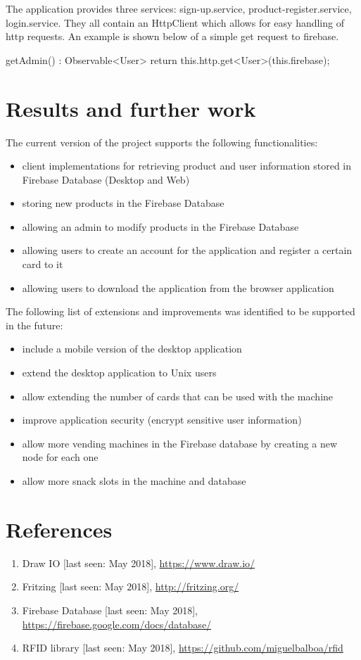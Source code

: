 \documentclass[a4paper,11pt]{article}
\begin{document}
The application provides three services: sign-up.service, product-register.service, login.service. They all contain an HttpClient
which allows for easy handling of http requests. An example is shown below of a simple get request to firebase.
\begin{python}
getAdmin() : Observable<User>{
    return this.http.get<User>(this.firebase);
  }
\end{python}
\section{Results and further work}

The current version of the project supports the following functionalities:
\begin{itemize}
\item client implementations for retrieving product and user information stored in Firebase Database (Desktop and Web)
\item storing new products in the Firebase Database
\item allowing an admin to modify products in the Firebase Database
\item allowing users to create an account for the application and register a certain card to it
\item allowing users to download the application from the browser application\\
\end{itemize}

The following list of extensions and improvements was identified to be supported in the future:
\begin{itemize}
\item include a mobile version of the desktop application
\item extend the desktop application to Unix users
\item allow extending the number of cards that can be used with the machine 
\item improve application security (encrypt sensitive user information)
\item allow more vending machines in the Firebase database by creating a new node for each one
\item allow more snack slots in the machine and database
\end{itemize}

\newpage
\section{References}
\begin{enumerate}
\item Draw IO [last seen: May 2018], \url{https://www.draw.io/}
\item Fritzing [last seen: May 2018], \url{http://fritzing.org/}
\item Firebase Database [last seen: May 2018], \url{https://firebase.google.com/docs/database/}
\item RFID library [last seen: May 2018], \url{https://github.com/miguelbalboa/rfid}
\end{enumerate}
\end{document}
